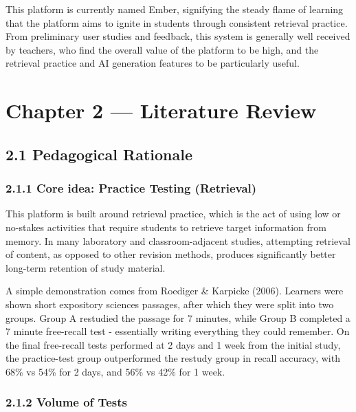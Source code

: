 \documentclass[
  12pt,
  a4paper,
]{report}
\begin{document}
This platform is currently named Ember, signifying the steady flame of learning that
the platform aims to ignite in students through consistent retrieval practice.
From preliminary user studies and feedback, this system is generally well received by
teachers, who find the overall value of the platform to be high, and the retrieval practice
and AI generation features to be particularly useful.

\hypertarget{chapter-2-literature-review}{%
\chapter{Chapter 2 --- Literature Review}\label{chapter-2-literature-review}}

\hypertarget{pedagogical-rationale}{%
\section{2.1 Pedagogical Rationale}\label{pedagogical-rationale}}

\hypertarget{core-idea-practice-testing-retrieval}{%
\subsection{2.1.1 Core idea: Practice Testing
(Retrieval)}\label{core-idea-practice-testing-retrieval}}

This platform is built around retrieval practice, which is the act of
using low or no-stakes activities that require students to retrieve
target information from memory. In many laboratory and
classroom-adjacent studies, attempting retrieval of content, as opposed
to other revision methods, produces significantly better long-term
retention of study material.

A simple demonstration comes from Roediger \& Karpicke (2006). Learners
were shown short expository sciences passages, after which they were
split into two groups. Group A restudied the passage for 7 minutes,
while Group B completed a 7 minute free-recall test - essentially
writing everything they could remember. On the final free-recall tests
performed at 2 days and 1 week from the initial study, the practice-test
group outperformed the restudy group in recall accuracy, with 68\% vs
54\% for 2 days, and 56\% vs 42\% for 1 week.

\hypertarget{volume-of-tests}{%
\subsection{2.1.2 Volume of Tests}\label{volume-of-tests}}
\end{document}
